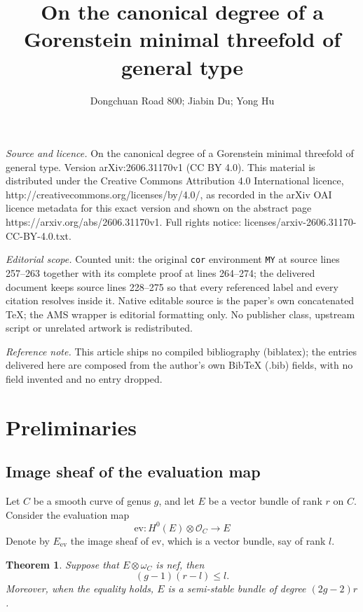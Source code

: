 \documentclass[10pt,a4paper]{amsart}
\newtheorem{thm}{Theorem}[section]
\numberwithin{equation}{section}
\newcommand{\ev}{\mathrm{ev}}
\newcommand{\sO}{\mathcal{O}}
\begin{document}
\title[On the canonical degree of a Gorenstein minimal threefold of]{On the canonical degree of a Gorenstein minimal threefold of general type}
\author{Dongchuan Road 800; Jiabin Du; Yong Hu}
\date{}
\maketitle
\noindent\emph{Source and licence.} On the canonical degree of a Gorenstein minimal threefold of general type. Version arXiv:2606.31170v1 (CC BY 4.0). This material is distributed under the Creative Commons Attribution 4.0 International licence, http://creativecommons.org/licenses/by/4.0/, as recorded in the arXiv OAI licence metadata for this exact version and shown on the abstract page https://arxiv.org/abs/2606.31170v1. Full rights notice: licenses/arxiv-2606.31170-CC-BY-4.0.txt.\par\smallskip
\noindent\textit{Editorial scope.} Counted unit: the original \texttt{cor} environment \texttt{MY} at source lines 257--263 together with its complete proof at lines 264--274; the delivered document keeps source lines 228--275 so that every referenced label and every citation resolves inside it. Native editable source is the paper's own concatenated TeX; the AMS wrapper is editorial formatting only. No publisher class, upstream script or unrelated artwork is redistributed.
\par\smallskip\noindent\textit{Reference note.} This article ships no compiled bibliography (biblatex); the entries delivered here are composed from the author's own BibTeX (.bib) fields, with no field invented and no entry dropped.
\section{Preliminaries}



\subsection{Image sheaf of the evaluation map}
Let $C$ be a smooth  curve of genus $g$, and let $E$ be a vector bundle of rank $r$ on $C$. Consider the evaluation map
\[
\ev\colon H^0(E)\otimes\sO_C\to E
\]
Denote by $E_{\ev}$ the image sheaf of $\ev$, which is a vector bundle, say of rank $l$.
\begin{thm}\cite[Proposition~page 476]{Xia86}\label{Xiao_Eev}
    Suppose that $E\otimes\omega_C$ is nef, then
    \[
    (g-1)(r-l)\leq l.
    \]
    Moreover, when the equality holds, $E$ is a semi-stable bundle of degree $(2g-2)r$.
\end{thm}
\end{document}
